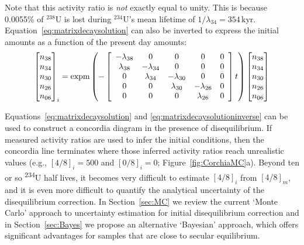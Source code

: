 \documentclass{article}
\begin{document}
Note that this activity ratio is \emph{not} exactly equal to
unity. This is because 0.0055\% of ${}^{238}$U is lost during
${}^{234}$U's mean lifetime of $1/\lambda_{34} =
354\,\mbox{kyr}$. Equation~\ref{eq:matrixdecaysolution} can also be
inverted to express the initial amounts as a function of the present
day amounts:
\begin{equation}
  \left[
    \begin{array}{@{}c@{}}
      n_{38}\\
      n_{34}\\
      n_{30}\\
      n_{26}\\
      n_{06}
    \end{array}
  \right]_i
  =
  \mbox{expm}\left(
      -
  \left[
    \begin{array}{ccccc}
      -\lambda_{38} & 0 & 0 & 0 & 0 \\
      \lambda_{38} & -\lambda_{34} & 0 & 0 & 0 \\
      0 & \lambda_{34} & -\lambda_{30} & 0 & 0 \\
      0 & 0 & \lambda_{30} & -\lambda_{26} & 0 \\
      0 & 0 & 0 & \lambda_{26} & 0\\
    \end{array}
    \right]
  t
  \right)
  \left[
    \begin{array}{@{}c@{}}
      n_{38}\\
      n_{34}\\
      n_{30}\\
      n_{26}\\
      n_{06}
    \end{array}
    \right]
  \label{eq:matrixdecaysolutioninverse}
\end{equation}

Equations~\ref{eq:matrixdecaysolution} and
\ref{eq:matrixdecaysolutioninverse} can be used to construct a
concordia diagram in the presence of disequilibrium. If measured
activity ratios are used to infer the initial conditions, then the
concordia line terminates where those inferred activity ratios reach
unrealistic values (e.g., $[4/8]_i=500$ and $[0/8]_i=0$;
Figure~\ref{fig:CorchiaMC}a). Beyond ten or so \textsuperscript{234}U
half lives, it becomes very difficult to estimate $[4/8]_i$ from
$[4/8]_m$, and it is even more difficult to quantify the analytical
uncertainty of the disequilibrium correction. In Section~\ref{sec:MC}
we review the current `Monte Carlo' approach to uncertainty estimation
for initial disequilibrium correction and in Section~\ref{sec:Bayes}
we propose an alternative `Bayesian' approach, which offers
significant advantages for samples that are close to secular
equilibrium.
\end{document}
